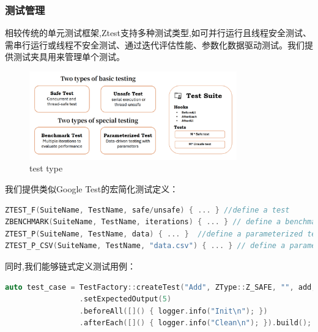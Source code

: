 \documentclass{article}
\begin{document}
\subsubsection{测试管理}


相较传统的单元测试框架,Ztest支持多种测试类型,如可并行运行且线程安全测试、需串行运行或线程不安全测试、通过迭代评估性能、参数化数据驱动测试。我们提供测试夹具用来管理单个测试。

\begin{figure}[H]
    \centering
    \includegraphics[width=0.8\textwidth]{img/types.png} %
    \caption{ test type}
    \label{fig:test types }
\end{figure}
我们提供类似Google Test的宏简化测试定义：
\begin{lstlisting}[language=C++]
ZTEST_F(SuiteName, TestName, safe/unsafe) { ... } //define a test 
ZBENCHMARK(SuiteName, TestName, iterations) { ... } // define a benchmark
ZTEST_P(SuiteName, TestName, data) { ... }  //define a parameterized test
ZTEST_P_CSV(SuiteName, TestName, "data.csv") { ... } // define a parameterized test with csv data
\end{lstlisting}

同时,我们能够链式定义测试用例：
\begin{lstlisting}[language=C++]
auto test_case = TestFactory::createTest("Add", ZType::Z_SAFE, "", add, 2, 3)
                 .setExpectedOutput(5)
                 .beforeAll([]() { logger.info("Init\n"); })          
                 .afterEach([]() { logger.info("Clean\n"); }).build();
                \end{lstlisting}
\end{document}
